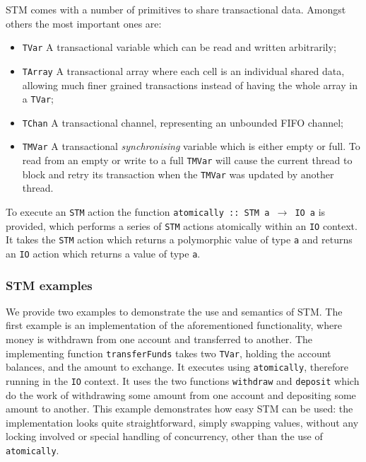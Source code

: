 STM comes with a number of primitives to share transactional data. Amongst others the most important ones are:

\begin{itemize}
	\item \texttt{TVar}   A transactional variable which can be read and written arbitrarily;
	\item \texttt{TArray}   A transactional array where each cell is an individual shared data, allowing much finer grained transactions instead of having the whole array in a \texttt{TVar};
	\item \texttt{TChan}   A transactional channel, representing an unbounded FIFO channel;
	\item \texttt{TMVar}   A transactional \textit{synchronising} variable which is either empty or full. To read from an empty or write to a full \texttt{TMVar} will cause the current thread to block and retry its transaction when the \texttt{TMVar} was updated by another thread.
\end{itemize}

To execute an \texttt{STM} action the function \texttt{atomically :: STM a $\to$ IO a} is provided, which performs a series of \texttt{STM} actions atomically within an \texttt{IO} context. It takes the \texttt{STM} action which returns a polymorphic value of type \texttt{a} and returns an \texttt{IO} action which returns a value of type \texttt{a}.

\subsubsection{STM examples}
\label{sub:stm_example}
We provide two examples to demonstrate the use and semantics of STM. The first example is an implementation of the aforementioned functionality, where money is withdrawn from one account and transferred to another. The implementing function \texttt{transferFunds} takes two \texttt{TVar}, holding the account balances, and the amount to exchange. It executes using \texttt{atomically}, therefore running in the \texttt{IO} context. It uses the two functions \texttt{withdraw} and \texttt{deposit} which do the work of withdrawing some amount from one account and depositing some amount to another. This example demonstrates how easy STM can be used: the implementation looks quite straightforward, simply swapping values, without any locking involved or special handling of concurrency, other than the use of \texttt{atomically}. \\ %

